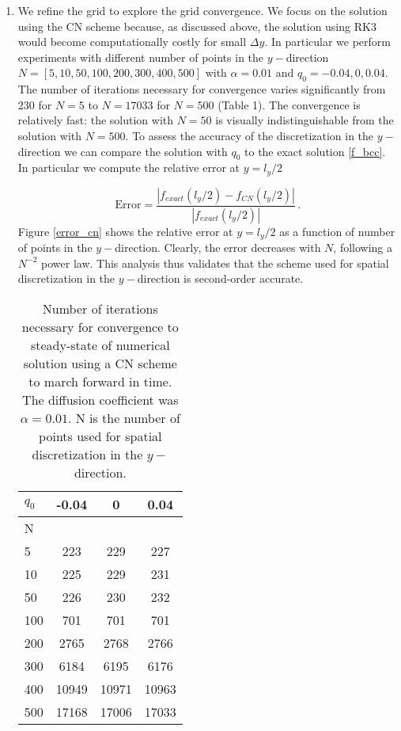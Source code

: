 \documentclass[11pt]{article}
\newcommand{\per}{\, .}
\def\beq{\begin{equation}}
\def\eeq{\end{equation}}
\begin{document}
\begin{enumerate}[label=(\alph*)]
    \item We refine the grid to explore the grid convergence. We focus on the solution using the CN scheme because, as discussed above, the solution using RK3 would become computationally costly for small $\Delta y$. In particular we perform experiments with different number of points in the $y-$direction $N = [5,10,50,100,200,300,400,500]$ with $\alpha = 0.01$ and $q_0=-0.04,0,0.04$.  The number of iterations necessary for convergence varies significantly from $230$ for $N=5$ to $N=17033$ for $N=500$ (Table 1).  The convergence is relatively fast: the solution with $N=50$ is visually indistinguishable from the solution with $N=500$. To assess the accuracy of  the discretization in the $y-$direction we can compare the solution with $q_0$ to the exact solution \eqref{f_bcc}. In particular we compute the relative error at $y=l_y/2$

        \beq
            \text{Error} = \frac{|f_{exact}(l_y/2)-f_{CN}(l_y/2)|}{|f_{exact}(l_y/2)|}\per
        \eeq
        Figure \ref{error_cn} shows the relative error at $y=l_y/2$ as a function of number of points in the $y-$direction. Clearly, the error decreases with $N$, following a $N^{-2}$ power law. This analysis thus validates that the scheme used for spatial discretization in the $y-$direction is second-order accurate.


    \begin{table}\label{iterations_conv}    
        \begin{center}
        \caption{Number of iterations necessary for convergence to steady-state of numerical solution using a CN scheme to march forward in time. The diffusion coefficient was $\alpha=0.01$. N is the number of points used for spatial discretization in the $y-$direction.}
        \begin{tabular}{ l |  c c c }\\
            $q_0$ & -0.04 & 0 & 0.04\\ \hline
            N & & & \\
             5 & 223 & 229 & 227\\
             10 & 225 & 229 & 231\\
             50 & 226 & 230 & 232\\
             100 & 701 & 701 & 701\\
             200 & 2765 & 2768 & 2766\\
             300 & 6184 & 6195 & 6176\\
             400 & 10949 & 10971 & 10963\\
             500 & 17168& 17006 & 17033 \\
        \end{tabular}
    \end{center}
        \end{table}



\end{enumerate}
\end{document}
